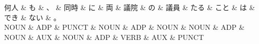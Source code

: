 \documentclass[tikz,border=5pt]{standalone}
\begin{document}
\normalsize
\begin{dependency}[edge unit distance=12.0pt]
    \begin{deptext}[column sep=1em]
        何人 \& も \& 、 \& 同時 \& に \& 両 \& 議院 \& の \& 議員 \& たる \& こと \& は \& でき \& ない \& 。\\
        NOUN \& ADP \& PUNCT \& NOUN \& ADP \& NOUN \& NOUN \& ADP \& NOUN \& AUX \& NOUN \& ADP \& VERB \& AUX \& PUNCT\\
    \end{deptext}
\end{dependency}
\end{document}

